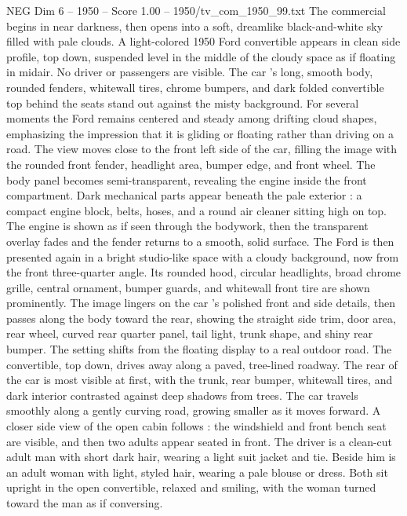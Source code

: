 \begin{textsample}{NEG Dim 6 – 1950 – Score 1.00 – 1950/tv\_com\_1950\_99.txt}  \label{ex:f6_neg_086}
The commercial begins in near darkness, then opens into a soft, dreamlike black-and-white sky filled with pale clouds.
A light-colored 1950 Ford convertible appears in clean side profile, top down, suspended level in the middle of the cloudy space as if floating in midair.
No driver or passengers are visible.
The car ’s long, smooth body, rounded fenders, whitewall tires, chrome bumpers, and dark folded convertible top behind the seats stand out against the misty background.
For several moments the Ford remains centered and steady among drifting cloud shapes, emphasizing the impression that it is gliding or floating rather than driving on a road.
The view moves close to the front left side of the car, filling the image with the rounded front fender, headlight area, bumper edge, and front wheel.
The body panel becomes semi-transparent, revealing the engine inside the front compartment.
Dark mechanical parts appear beneath the pale exterior : a compact engine block, belts, hoses, and a round air cleaner sitting high on top.
The engine is shown as if seen through the bodywork, then the transparent overlay fades and the fender returns to a smooth, solid surface.
The Ford is then presented again in a bright studio-like space with a cloudy background, now from the front three-quarter angle.
Its rounded hood, circular headlights, broad chrome grille, central ornament, bumper guards, and whitewall front tire are shown prominently.
The image lingers on the car ’s polished front and side details, then passes along the body toward the rear, showing the straight side trim, door area, rear wheel, curved rear quarter panel, tail light, trunk shape, and shiny rear bumper.
The setting shifts from the floating display to a real outdoor road.
The convertible, top down, drives away along a paved, tree-lined roadway.
The rear of the car is most visible at first, with the trunk, rear bumper, whitewall tires, and dark interior contrasted against deep shadows from trees.
The car travels smoothly along a gently curving road, growing smaller as it moves forward.
A closer side view of the open cabin follows : the windshield and front bench seat are visible, and then two adults appear seated in front.
The driver is a clean-cut adult man with short dark hair, wearing a light suit jacket and tie.
Beside him is an adult woman with light, styled hair, wearing a pale blouse or dress.
Both sit upright in the open convertible, relaxed and smiling, with the woman turned toward the man as if conversing.

\end{textsample}
